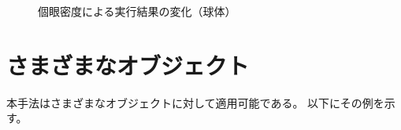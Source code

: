 \begin{figure}[htbp]
{\label{FReso100Sphere}}
  \caption{個眼密度による実行結果の変化（球体）}
  \label{FResoSphere}
\end{figure}



\section{さまざまなオブジェクト}
\label{SVariousObject}

本手法はさまざまなオブジェクトに対して適用可能である。
以下にその例を示す。

